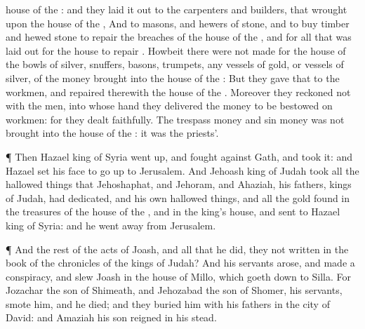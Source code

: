 {house of the
{}: and they laid it
out to the
carpenters and
builders, that
wrought upon the
house of the
{},
And to
masons, and
hewers of
stone, and to
buy
timber and
hewed
stone to
repair the
breaches of the
house of the
{}, and for all that was laid
out for the
house to
repair
{}.
Howbeit there were not
made for the
house of the
{}
bowls of
silver,
snuffers,
basons,
trumpets, any
vessels of
gold, or
vessels of
silver, of the
money
{}
brought into the
house of the
{}:
But they
gave that to the
workmen, and
repaired therewith the
house of the
{}.
Moreover they
reckoned not with the
men, into whose
hand they
delivered the
money to be
bestowed on
workmen: for they
dealt
faithfully.
The
trespass
money and
sin
money was not
brought into the
house of the
{}: it was the
priests’.
\par }{\PP {}¶ Then
Hazael
king of
Syria went
up, and
fought against
Gath, and
took it: and
Hazael
set his
face to go
up to
Jerusalem.
And
Jehoash
king of
Judah
took all the hallowed
things that
Jehoshaphat, and
Jehoram, and
Ahaziah, his
fathers,
kings of
Judah, had
dedicated, and his own hallowed
things, and all the
gold
{}
found in the
treasures of the
house of the
{}, and in the
king’s
house, and
sent
{} to
Hazael
king of
Syria: and he went
away from
Jerusalem.
\par }{\PP {}¶ And the
rest of the
acts of
Joash, and all that he
did,
{} they not
written in the
book of the
chronicles of the
kings of
Judah?
And his
servants
arose, and
made a
conspiracy, and
slew
Joash in the
house of
Millo, which goeth
down to
Silla.
For
Jozachar the
son of
Shimeath, and
Jehozabad the
son of
Shomer, his
servants,
smote him, and he
died; and they
buried him with his
fathers in the
city of
David: and
Amaziah his
son
reigned in his stead.

}
